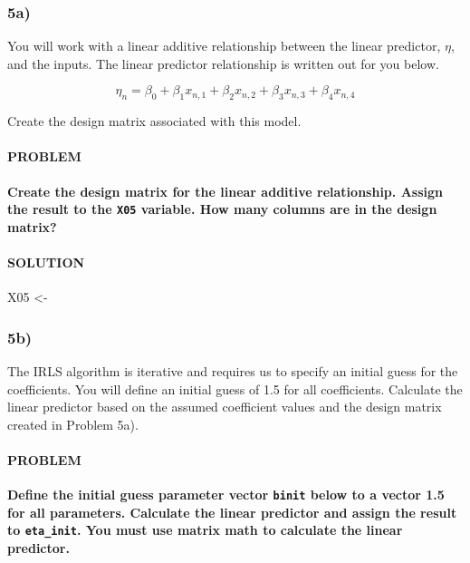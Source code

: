 \documentclass[
]{article}
\newenvironment{Shaded}{\begin{snugshade}}{\end{snugshade}}
\newcommand{\NormalTok}[1]{#1}
\newcommand{\StringTok}[1]{\textcolor[rgb]{0.31,0.60,0.02}{#1}}
\begin{document}
\hypertarget{a-4}{%
\subsubsection{5a)}\label{a-4}}

You will work with a linear additive relationship between the linear
predictor, \(\eta\), and the inputs. The linear predictor relationship
is written out for you below.

\[ 
\eta_n = \beta_0 + \beta_1 x_{n,1} + \beta_2 x_{n,2} + \beta_3 x_{n,3} + \beta_4 x_{n,4}
\]

Create the design matrix associated with this model.

\hypertarget{problem-23}{%
\paragraph{PROBLEM}\label{problem-23}}

\textbf{Create the design matrix for the linear additive relationship.
Assign the result to the \texttt{X05} variable. How many columns are in
the design matrix?}

\hypertarget{solution-22}{%
\paragraph{SOLUTION}\label{solution-22}}

\begin{Shaded}
\begin{Highlighting}[]
\NormalTok{X05 <-}\StringTok{ }
\end{Highlighting}
\end{Shaded}

\hypertarget{b-4}{%
\subsubsection{5b)}\label{b-4}}

The IRLS algorithm is iterative and requires us to specify an initial
guess for the coefficients. You will define an initial guess of 1.5 for
all coefficients. Calculate the linear predictor based on the assumed
coefficient values and the design matrix created in Problem 5a).

\hypertarget{problem-24}{%
\paragraph{PROBLEM}\label{problem-24}}

\textbf{Define the initial guess parameter vector \texttt{binit} below
to a vector 1.5 for all parameters. Calculate the linear predictor and
assign the result to \texttt{eta\_init}. You must use matrix math to
calculate the linear predictor.}
\end{document}
